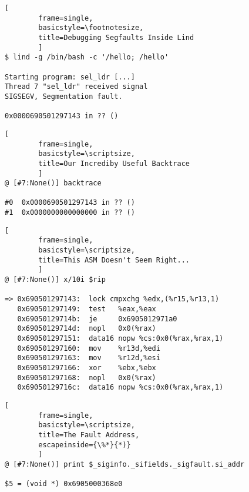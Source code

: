 \documentclass[compress,red]{beamer}
\begin{document}
%

%

\lstset{language=Bash}

\pagebreak
\begin{lstlisting}[
        frame=single,
        basicstyle=\footnotesize,
        title=Debugging Segfaults Inside Lind
        ]
$ lind -g /bin/bash -c '/hello; /hello'

Starting program: sel_ldr [...]
Thread 7 "sel_ldr" received signal
SIGSEGV, Segmentation fault.

0x0000690501297143 in ?? ()
\end{lstlisting}
\newpage

\pagebreak
\begin{lstlisting}[
        frame=single,
        basicstyle=\scriptsize,
        title=Our Incrediby Useful Backtrace
        ]
@ [#7:None()] backtrace

#0  0x0000690501297143 in ?? ()
#1  0x0000000000000000 in ?? ()
\end{lstlisting}
\newpage

\pagebreak
\begin{lstlisting}[
        frame=single,
        basicstyle=\scriptsize,
        title=This ASM Doesn't Seem Right...
        ]
@ [#7:None()] x/10i $rip

=> 0x690501297143:  lock cmpxchg %edx,(%r15,%r13,1)
   0x690501297149:  test   %eax,%eax
   0x69050129714b:  je     0x6905012971a0
   0x69050129714d:  nopl   0x0(%rax)
   0x690501297151:  data16 nopw %cs:0x0(%rax,%rax,1)
   0x690501297160:  mov    %r13d,%edi
   0x690501297163:  mov    %r12d,%esi
   0x690501297166:  xor    %ebx,%ebx
   0x690501297168:  nopl   0x0(%rax)
   0x69050129716c:  data16 nopw %cs:0x0(%rax,%rax,1)
\end{lstlisting}
\newpage

\pagebreak
\begin{lstlisting}[
        frame=single,
        basicstyle=\scriptsize,
        title=The Fault Address,
        escapeinside={\%*}{*)}
        ]
@ [#7:None()] print $_siginfo._sifields._sigfault.si_addr

$5 = (void *) 0x6905000368e0
\end{lstlisting}
\newpage
\end{document}

